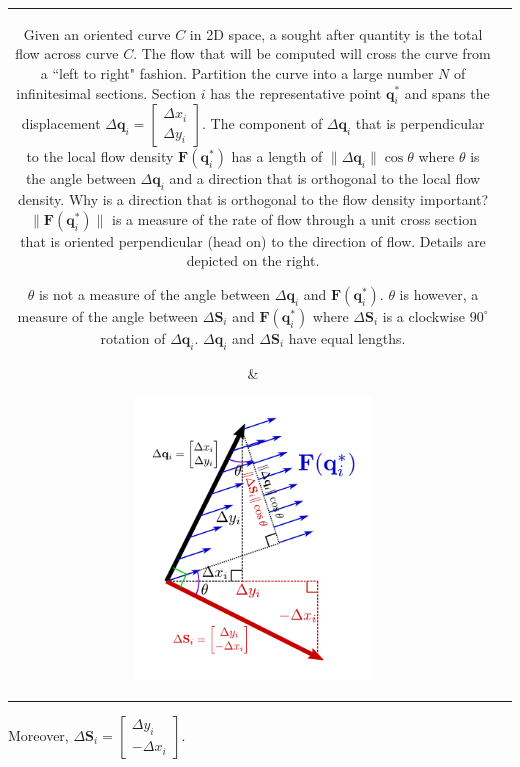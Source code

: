 \documentclass{article}
\begin{document}
\begin{tabular}{cc}
\parbox{0.5\textwidth}{
Given an oriented curve \(C\) in 2D space, a sought after quantity is the total flow across curve \(C\). The flow that will be computed will cross the curve from a ``left to right" fashion. Partition the curve into a large number \(N\) of infinitesimal sections. Section \(i\) has the representative point \(\mathbf{q}_i^*\) and spans the displacement \(\Delta\mathbf{q}_i = \begin{bmatrix} \Delta x_i \\ \Delta y_i \end{bmatrix}\). The component of \(\Delta\mathbf{q}_i\) that is perpendicular to the local flow density \(\mathbf{F}(\mathbf{q}_i^*)\) has a length of \(\|\Delta\mathbf{q}_i\|\cos\theta\) where \(\theta\) is the angle between \(\Delta\mathbf{q}_i\) and a direction that is orthogonal to the local flow density. Why is a direction that is orthogonal to the flow density important? \(\|\mathbf{F}(\mathbf{q}_i^*)\|\) is a measure of the rate of flow through a unit cross section that is oriented perpendicular (head on) to the direction of flow. Details are depicted on the right. 

\(\theta\) is not a measure of the angle between \(\Delta\mathbf{q}_i\) and \(\mathbf{F}(\mathbf{q}_i^*)\). \(\theta\) is however, a measure of the angle between \(\Delta\mathbf{S}_i\) and \(\mathbf{F}(\mathbf{q}_i^*)\) where \(\Delta\mathbf{S}_i\) is a clockwise \(90^\circ\) rotation of \(\Delta\mathbf{q}_i\). \(\Delta\mathbf{q}_i\) and \(\Delta\mathbf{S}_i\) have equal lengths.       
} & \parbox{0.5\textwidth}{
\includegraphics[width = 0.5\textwidth]{flux_through_dq}
}
\end{tabular}

Moreover, \(\Delta\mathbf{S}_i = \begin{bmatrix} \Delta y_i \\ -\Delta x_i \end{bmatrix}\). 
\end{document}
